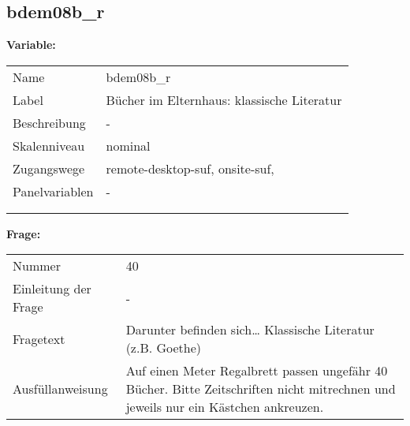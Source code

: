 	
	
	\subsection{bdem08b\_r}
	\label{subSection:bdem08b_r}

	\noindent\textbf{Variable:}\\
		\begin{tabular}{lL{11.3cm}}
			\label{tableVariable:bdem08b_r}
			Name & bdem08b\_r \\
			Label & Bücher im Elternhaus: klassische Literatur \\
			Beschreibung & - \\
			Skalenniveau & nominal \\
			Zugangswege &
				remote-desktop-suf,
				onsite-suf,
 \\
			Panelvariablen & -
			 \\
			 \\
 \\
		\end{tabular}

		\vspace*{1 cm}
		\noindent\textbf{Frage:}\\
		\begin{tabular}{lL{11.3cm}}
			\label{tableQuestion:bdem08b_r}
			Nummer & 40 \\
			Einleitung der Frage & - \\
			Fragetext & Darunter befinden sich…
Klassische Literatur (z.B. Goethe) \\
			Ausfüllanweisung & Auf einen Meter Regalbrett passen ungefähr 40 Bücher. Bitte Zeitschriften nicht mitrechnen und jeweils nur ein Kästchen ankreuzen. \\
		\end{tabular}





